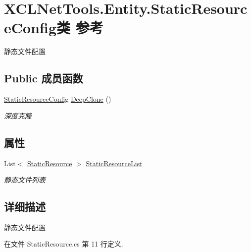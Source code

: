 \hypertarget{class_x_c_l_net_tools_1_1_entity_1_1_static_resource_config}{\section{X\-C\-L\-Net\-Tools.\-Entity.\-Static\-Resource\-Config类 参考}
\label{class_x_c_l_net_tools_1_1_entity_1_1_static_resource_config}
}


静态文件配置  


\subsection*{Public 成员函数}
\begin{DoxyCompactItemize}
\item 
\hyperlink{class_x_c_l_net_tools_1_1_entity_1_1_static_resource_config}{Static\-Resource\-Config} \hyperlink{class_x_c_l_net_tools_1_1_entity_1_1_static_resource_config_a488ef1a24b5a4be8cdfc93610cc8bb31}{Deep\-Clone} ()
\begin{DoxyCompactList}\small\item\em 深度克隆 \end{DoxyCompactList}\end{DoxyCompactItemize}
\subsection*{属性}
\begin{DoxyCompactItemize}
\item 
List$<$ \hyperlink{class_x_c_l_net_tools_1_1_entity_1_1_static_resource}{Static\-Resource} $>$ \hyperlink{class_x_c_l_net_tools_1_1_entity_1_1_static_resource_config_a4525e28db253a1da329b5ebd1982f04d}{Static\-Resource\-List}
\begin{DoxyCompactList}\small\item\em 静态文件列表 \end{DoxyCompactList}\end{DoxyCompactItemize}


\subsection{详细描述}
静态文件配置 



在文件 Static\-Resource.\-cs 第 11 行定义.



